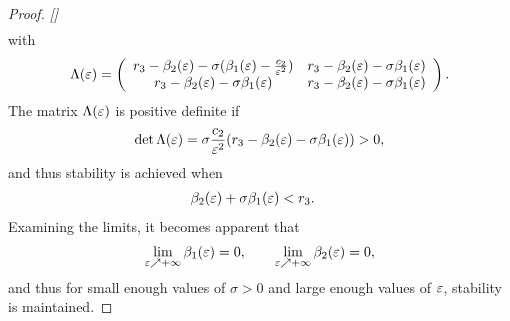 \begin{proof}{\em []}
\begin{align*}
  \end{align*}
  with
  \begin{align*}
    \Lambda(\varepsilon) = \left(\begin{array}{c c}
      r_{3} - \beta_{2}(\varepsilon) - \sigma (\beta_{1}(\varepsilon) - \frac{c_{2}}{\varepsilon^{2}}) &
      r_{3} - \beta_{2}(\varepsilon) - \sigma \beta_{1}(\varepsilon)\\
      r_{3} - \beta_{2}(\varepsilon) - \sigma \beta_{1}(\varepsilon) & r_{3} - \beta_{2}(\varepsilon) - \sigma \beta_{1}(\varepsilon)
    \end{array}\right).
  \end{align*}
  The matrix $\Lambda(\varepsilon)$ is positive definite if
  \begin{align*}
    \det \Lambda(\varepsilon) = \sigma\frac{c_{2}}{\varepsilon^{2}} (r_{3} - \beta_{2}(\varepsilon) - \sigma
    \beta_{1}(\varepsilon)) > 0,
  \end{align*}
  and thus stability is achieved when
  \begin{align*}
    &\beta_{2}(\varepsilon) + \sigma \beta_{1}(\varepsilon) < r_{3}.
  \end{align*}
  Examining the limits, it becomes apparent that
  \begin{align*}
    \lim_{\varepsilon \nearrow +\infty} \beta_{1}(\varepsilon) = 0, \qquad \lim_{\varepsilon \nearrow +\infty} \beta_{2}(\varepsilon) = 0,
  \end{align*}
  and thus for small enough values of $\sigma > 0$ and large enough values of
  $\varepsilon$, stability is maintained.
\end{proof}
